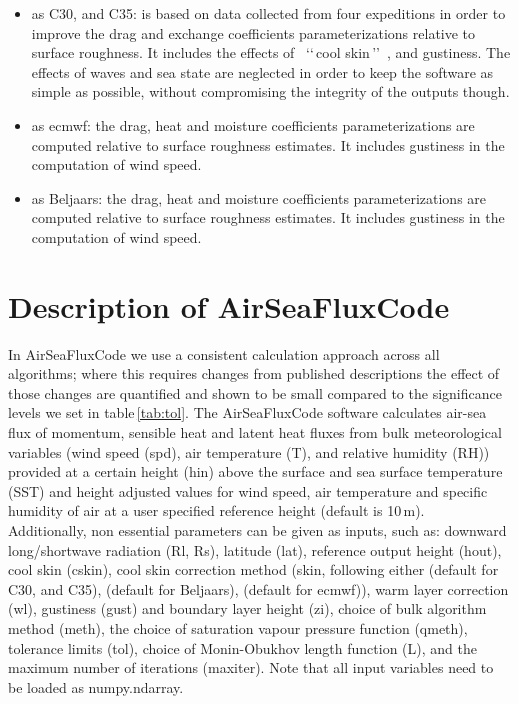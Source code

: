 \documentclass[letterpaper,10pt,english]{sphinxmanual}
\begin{document}
\begin{itemize}
\item \cite{Fairall_etal_1996a, Fairall_etal_2003, Edson_etal_2013} as C30, and C35: is based on data collected from four expeditions in order to improve the drag and exchange coefficients parameterizations relative to surface roughness. It includes the effects of ~\lq\lq\,cool skin\,\rq\rq~, and gustiness. The effects of waves and sea state are neglected in order to keep the software as simple as possible, without compromising the integrity of the outputs though.

\item \cite{era5_2019} as ecmwf: the drag, heat and moisture coefficients parameterizations are computed relative to surface roughness estimates. It includes gustiness in the computation of wind speed.

\item \cite{Beljaars_1995a, Beljaars_1995b, Zeng_Beljaars_2005} as Beljaars: the drag, heat and moisture coefficients parameterizations are computed relative to surface roughness estimates. It includes gustiness in the computation of wind speed.
\end{itemize}

\section{Description of AirSeaFluxCode}
\label{\detokenize{index:description-of-AirSeaFluxCode}}
In AirSeaFluxCode we use a consistent calculation approach across all algorithms; where this requires changes from published descriptions the effect of those changes are quantified and shown to be small compared to the significance levels we set in table\,\ref{tab:tol}. The AirSeaFluxCode software calculates air-sea flux of momentum, sensible heat and latent heat fluxes from bulk meteorological variables (wind speed (spd), air temperature (T), and relative humidity (RH)) provided at a certain height (hin) above the surface and sea surface temperature (SST) and height adjusted values for wind speed, air temperature and specific humidity of air at a user specified reference height (default is 10\,m). \\
Additionally, non essential parameters can be given as inputs, such as: downward long/shortwave radiation (Rl, Rs), latitude (lat), reference output height (hout),  cool skin (cskin), cool skin correction method (skin, following either  \cite{Fairall_etal_1996b} (default for C30, and C35), \cite{Zeng_Beljaars_2005} (default for Beljaars), \cite{era5_2019} (default for ecmwf)), warm layer correction (wl), gustiness (gust) and boundary layer height (zi), choice of bulk algorithm method (meth), the choice of saturation vapour pressure function (qmeth), tolerance limits (tol), choice of Monin-Obukhov length function (L), and the maximum number of iterations (maxiter). Note that all input variables need to be loaded as numpy.ndarray.
\end{document}
